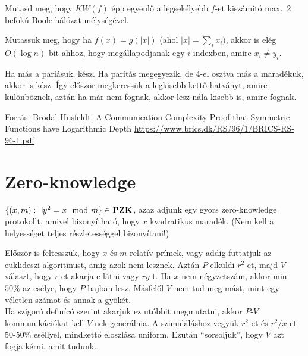 \begin{Exercise}[counter={sorszam}, difficulty=1]
	Mutasd meg, hogy $KW(f)$ \'epp egyenl\H o a legsek\'elyebb $f$-et kisz\'am\'it\'o max.\ 2 befok\'u Boole-h\'al\'ozat m\'elys\'eg\'evel.
\end{Exercise}%

\begin{Exercise}[counter={sorszam}, difficulty=1]\label{kwsym}
	Mutassuk meg, hogy ha $f(x)=g(|x|)$ (ahol $|x|=\sum_i x_i)$, akkor is el\'eg $O(\log n)$ bit ahhoz, hogy megállapodjanak egy $i$ indexben, amire $x_i\neq y_i$. 
\end{Exercise}
\begin{Answer}
	Ha m\'as a pari\'asuk, k\'esz. Ha parit\'as megegyezik, de 4-el osztva m\'as a marad\'ekuk, akkor is k\'esz. \'Igy el\H osz\"or megkeress\"uk a legkisebb kett\H o hatv\'anyt, amire k\"ul\"onb\"oznek, azt\'an ha m\'ar nem fognak, akkor lesz n\'ala kisebb is, amire fognak.
	
	Forr\'as: Brodal-Husfeldt: A Communication Complexity Proof that Symmetric Functions have Logarithmic Depth \url{https://www.brics.dk/RS/96/1/BRICS-RS-96-1.pdf}
\end{Answer}

\section{Zero-knowledge}

\begin{Exercise}[counter={sorszam}, difficulty=0]
	$\{(x,m): \exists y^2=x \mod m\}\in {\mbox{\ensuremath{\mathbf{PZK}}}}$, azaz adjunk egy gyors zero-knowledge protokollt, amivel bizony\'ithat\'o, hogy $x$ kvadratikus marad\'ek. (Nem kell a helyess\'eget teljes r\'eszletess\'eggel bizony\'itani!)
\end{Exercise}	
\begin{Answer}
	El\H osz\"or is feltessz\"uk, hogy $x$ \'es $m$ relat\'iv pr\'imek, vagy addig futtatjuk az euklideszi algoritmust, am\'ig azok nem lesznek.
	Azt\'an $P$ elk\"uldi $r^2$-et, majd $V$ v\'alaszt, hogy $r$-et akarja-e l\'atni vagy $ry$-t.
	Ha $x$ nem n\'egyzetsz\'am, akkor min $50\%$ az es\'elye, hogy $P$ bajban lesz.
	M\'asfel\H ol $V$ nem tud meg m\'ast, mint egy v\'eletlen sz\'amot \'es annak a gy\"ok\'et.\\	
	Ha szigor\'u defin\'ic\'o szerint akarjuk ez ut\'obbit megmutatni, akkor $P$-$V$ kommunik\'aci\'okat kell $V$-nek gener\'alnia. A szimul\'al\'ashoz vegy\"uk $r^2$-et \'es $r^2/x$-et $50$-$50\%$ es\'ellyel, mindkett\H o eloszl\'asa uniform.
	Ezut\'an ``sorsoljuk'', hogy $V$ azt fogja k\'erni, amit tudunk. 
\end{Answer}



